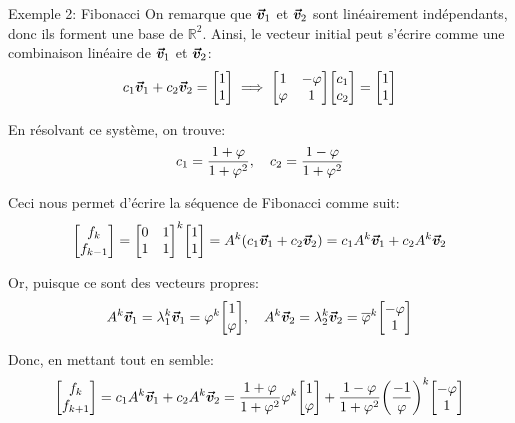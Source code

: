 \documentclass[a4paper]{article}
\begin{document}
\begin{parag}{Exemple 2: Fibonacci}
    On remarque que $\bm{\protect\vec{v}}_1$ et $\bm{\protect\vec{v}}_2$ sont linéairement indépendants, donc ils forment une base de $\mathbb{R}^2$. Ainsi, le vecteur initial peut s'écrire comme une combinaison linéaire de $\bm{\protect\vec{v}}_1$ et $\bm{\protect\vec{v}}_2$: 
    \[c_1 \bvec{v}_1 + c_2 \bvec{v}_2 = \begin{bmatrix} 1 \\ 1 \end{bmatrix} \implies \begin{bmatrix} 1 & -\phi \\ \phi & 1 \end{bmatrix} \begin{bmatrix} c_1 \\ c_2 \end{bmatrix} = \begin{bmatrix} 1 \\ 1 \end{bmatrix} \]

    En résolvant ce système, on trouve:
    \[c_1 = \frac{1 + \varphi}{1 + \varphi^2}, \quad c_2 = \frac{1 - \varphi}{1 + \varphi^2}\]
    
    Ceci nous permet d'écrire la séquence de Fibonacci comme suit: 
    \[\begin{bmatrix} f_{k} \\ f_{k-1} \end{bmatrix} = \begin{bmatrix} 0 & 1 \\ 1 & 1 \end{bmatrix}^{k} \begin{bmatrix} 1 \\ 1 \end{bmatrix} = A^k\left(c_1 \bvec{v}_1 + c_2 \bvec{v}_2\right) = c_1 A^{k} \bvec{v}_1 + c_2 A^{k} \bvec{v}_2\]
    
    Or, puisque ce sont des vecteurs propres: 
    \[A^{k} \bvec{v}_1 = \lambda_1^{k} \bvec{v}_1 = \phi^k \begin{bmatrix} 1 \\ \phi \end{bmatrix}, \mathspace A^k \bvec{v}_2 = \lambda_2^k \bvec{v}_2 = \bar{\phi}^{k} \begin{bmatrix} -\phi \\ 1 \end{bmatrix} \]

    Donc, en mettant tout en semble: 
    \[\begin{bmatrix} f_{k} \\ f_{k+1} \end{bmatrix} = c_1 A^{k} \bvec{v}_1 + c_2 A^{k} \bvec{v}_2 = \frac{1 + \phi}{1 + \phi^2} \phi^{k} \begin{bmatrix} 1 \\ \phi \end{bmatrix} + \frac{1 - \phi}{1 + \phi^2} \left(\frac{-1}{\phi}\right)^{k} \begin{bmatrix} -\phi \\ 1 \end{bmatrix} \]
    

\end{parag}
\end{document}
